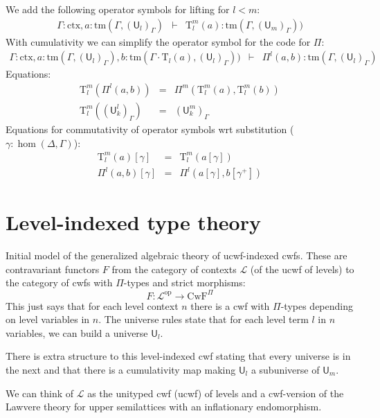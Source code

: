 \documentclass[11pt,a4paper]{article}
\theoremstyle{definition}
\newcommand{\UU}{\mathsf{U}}
\def\UU{\mathsf{U}}
\newcommand{\N}{\mathsf{N}}
\def\Pihat{\Pi}
\newcommand{\ctx}{\mathrm{ctx}}
\newcommand{\tm}{\mathrm{tm}}
\def\U{\mathsf{U}}
\newcommand{\Ta}{\mathrm{T}}
\def\L{{\mathcal{L}}}
\def\CwF{\mathrm{CwF}}
\begin{document}
\begin{tiny}
We add the following operator symbols for lifting for $l < m$:
\begin{eqnarray*}
\Gamma : \ctx, a : \tm(\Gamma,(\U_{l})_\Gamma) &\vdash& {\Ta^m_{l}}(a) : \tm(\Gamma,(\U_{m})_\Gamma))
\end{eqnarray*}
With cumulativity we can simplify the operator symbol for the code for $\Pi$:
\begin{eqnarray*}
\Gamma : \ctx,
a : \tm(\Gamma,(\U_{l})_\Gamma),
b :  \tm(\Gamma \cdot \Ta_{l}(a), (\U_{l})_\Gamma))
&\vdash&
 \Pihat^{l}(a,b) : \tm(\Gamma,(\U_{l})_\Gamma)
\end{eqnarray*}
Equations:
\begin{eqnarray*}
\Ta^m_{l}(\Pi^{l}(a,b)) &=& \Pi^m(\Ta^m_l(a),\Ta^m_l(b))\\
\Ta^m_l((\UU^l_k)_\Gamma) &=& (\UU^m_k)_\Gamma
\end{eqnarray*}
Equations for commutativity of operator symbols wrt substitution ($\gamma : \hom(\Delta,\Gamma)$):
\begin{eqnarray*}
\Ta^m_l(a) [ \gamma ] &=& \Ta^m_l(a[ \gamma ] )\\
\Pi^{l}(a,b)[ \gamma ] &=& \Pi^{l}(a [ \gamma ], b[ \gamma^+ ])
\end{eqnarray*}
\end{tiny}

\section{Level-indexed type theory}

Initial model of the generalized algebraic theory of ucwf-indexed cwfs. These are contravariant functors $F$ from the category of contexts $\L$ (of the ucwf of levels) to the category of cwfs with $\Pi$-types and strict morphisms:
$$
F : \L^\mathrm{op} \to \CwF^{\Pi}
$$
This just says that for each level context $n$ there is a cwf with $\Pi$-types depending on level variables in $n$. The universe rules state that for each level term $l$ in $n$ variables, we can build a universe $\UU_l$.

 There is extra structure to this level-indexed cwf stating that every universe is in the next and that there is a cumulativity map making $\U_l$ a subuniverse of $\UU_m$.

We can think of $\L$ as the unityped cwf (ucwf) of levels and a cwf-version of the Lawvere theory for upper semilattices with an inflationary endomorphism.
\end{document}
